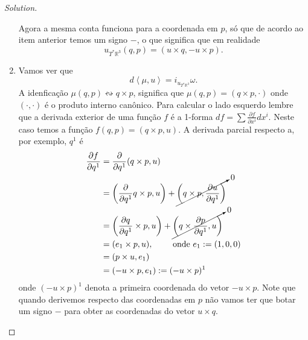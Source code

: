 \begin{proof}[Solution]
\begin{enumerate}[label=\alph*.]
Agora a mesma conta funciona para a coordenada em  $p$, só que de acordo ao item anterior temos um signo $-$, o que significa que em realidade
 \[u_{T^*\mathbb{R}^3}(q,p)=(u\times q, -u \times p).\]

\item Vamos ver que
	\[d\left<\mu,u\right>=i_{u_{T^*\mathbb{R}^3}}\omega.\]
       A idenficação $\mu(q,p)\leftrightsquigarrow q\times p$, significa que $\mu(q,p)=(q\times p,  \cdot)$ onde $(\cdot,\cdot)$ é o produto interno canônico. Para calcular o lado esquerdo lembre que a derivada exterior de uma função $f$  é a 1-forma $df=\sum \frac{\partial f}{\partial x^i}dx^i$. Neste caso temos a função $f(q,p)=(q\times p,u)$. A derivada parcial respecto a, por exemplo, $q^1$ é
\begin{align*}
\frac{\partial f}{\partial q^1}&=\frac{\partial }{\partial q^1}(q\times p, u)\\&=\left( \frac{\partial }{\partial q^1}q\times p, u \right) +\cancelto{0}{\left( q \times p, \frac{\partial u}{\partial q^1} \right) }\\
&=\left( \frac{\partial q}{\partial q^1}\times p, u \right) +\cancelto{0}{\left( q \times \frac{\partial p}{\partial q^1},u \right) }\\
&=(e_1 \times p ,u), \qquad \text{ onde } e_1:=(1,0,0)\\
&=(p \times u, e_1)\\
&=(-u \times p, e_1):=(-u \times p)^1
\end{align*}
onde $(-u \times p)^1$ denota a primeira coordenada do vetor $-u\times p$. Note que quando derivemos respecto das coordenadas em $p$ não vamos ter que botar um signo $-$ para obter as coordenadas do vetor  $u\times q$.


\end{enumerate}
\end{proof}
